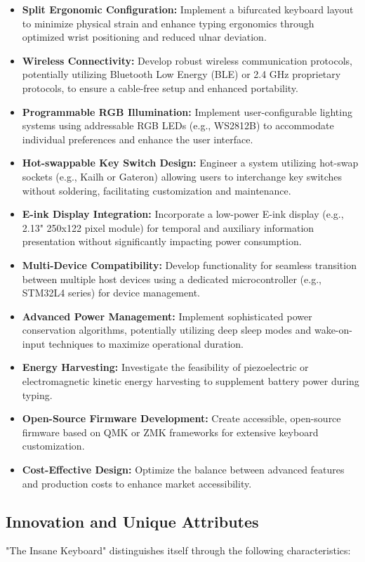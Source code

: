 \documentclass[a4paper,11pt]{article}%
\begin{document}
\begin{itemize}
    \item \textbf{Split Ergonomic Configuration:} Implement a bifurcated keyboard layout to minimize physical strain and enhance typing ergonomics through optimized wrist positioning and reduced ulnar deviation.
    \item \textbf{Wireless Connectivity:} Develop robust wireless communication protocols, potentially utilizing Bluetooth Low Energy (BLE) or 2.4 GHz proprietary protocols, to ensure a cable-free setup and enhanced portability.
    \item \textbf{Programmable RGB Illumination:} Implement user-configurable lighting systems using addressable RGB LEDs (e.g., WS2812B) to accommodate individual preferences and enhance the user interface.
    \item \textbf{Hot-swappable Key Switch Design:} Engineer a system utilizing hot-swap sockets (e.g., Kailh or Gateron) allowing users to interchange key switches without soldering, facilitating customization and maintenance.
    \item \textbf{E-ink Display Integration:} Incorporate a low-power E-ink display (e.g., 2.13" 250x122 pixel module) for temporal and auxiliary information presentation without significantly impacting power consumption.
    \item \textbf{Multi-Device Compatibility:} Develop functionality for seamless transition between multiple host devices using a dedicated microcontroller (e.g., STM32L4 series) for device management.
    \item \textbf{Advanced Power Management:} Implement sophisticated power conservation algorithms, potentially utilizing deep sleep modes and wake-on-input techniques to maximize operational duration.
    \item \textbf{Energy Harvesting:} Investigate the feasibility of piezoelectric or electromagnetic kinetic energy harvesting to supplement battery power during typing.
    \item \textbf{Open-Source Firmware Development:} Create accessible, open-source firmware based on QMK or ZMK frameworks for extensive keyboard customization.
    \item \textbf{Cost-Effective Design:} Optimize the balance between advanced features and production costs to enhance market accessibility.
\end{itemize}

\subsection{Innovation and Unique Attributes}
"The Insane Keyboard" distinguishes itself through the following characteristics:
\end{document}

